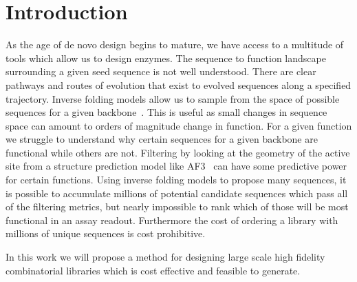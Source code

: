 \section{Introduction}

As the age of de novo design begins to mature, we have access to a multitude of
tools which allow us to design enzymes. The sequence to function landscape
surrounding a given seed sequence is not well understood. There are clear
pathways and routes of evolution that exist to evolved sequences along a
specified trajectory. Inverse folding models allow us to sample from the space
of possible sequences for a given
backbone~\cite{dauparas2022proteinmpnn,dauparas2025ligandmpnn,hsu2022esmif}.
This is useful as small changes in sequence space can amount to orders of
magnitude change in function. For a given function we struggle to understand
why certain sequences for a given backbone are functional while others are not.
Filtering by looking at the geometry of the active site from a structure
prediction model like AF3~\cite{abramson2024alphafold3} can have some
predictive power for certain functions. Using inverse folding models to propose
many sequences, it is possible to accumulate millions of potential candidate
sequences which pass all of the filtering metrics, but nearly impossible to
rank which of those will be most functional in an assay readout. Furthermore
the cost of ordering a library with millions of unique sequences is cost
prohibitive.

In this work we will propose a method for designing large scale high fidelity
combinatorial libraries which is cost effective and feasible to generate.

